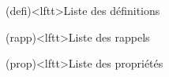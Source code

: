 \documentclass[../../main/main.tex]{subfiles}
\begin{document}
\newpage

\vspace*{\fill}
\begin{boxes}
	\begin{tcb}(defi)<lftt>{Liste des définitions}
	\end{tcb}
	\begin{tcb}(rapp)<lftt>{Liste des rappels}
	\end{tcb}
	\begin{tcb}(prop)<lftt>{Liste des propriétés}
	\end{tcb}

\end{boxes}
\end{document}
